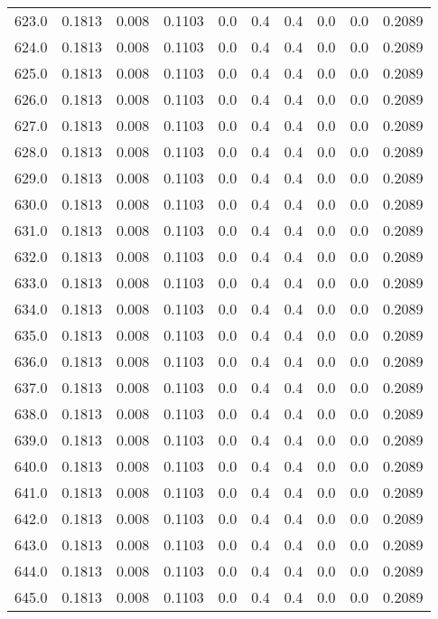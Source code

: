 \begin{longtable}{lrrrrrrrrr}
623.0 & 0.1813 & 0.008 & 0.1103 & 0.0 & 0.4 & 0.4 & 0.0 & 0.0 & 0.2089 \\
624.0 & 0.1813 & 0.008 & 0.1103 & 0.0 & 0.4 & 0.4 & 0.0 & 0.0 & 0.2089 \\
625.0 & 0.1813 & 0.008 & 0.1103 & 0.0 & 0.4 & 0.4 & 0.0 & 0.0 & 0.2089 \\
626.0 & 0.1813 & 0.008 & 0.1103 & 0.0 & 0.4 & 0.4 & 0.0 & 0.0 & 0.2089 \\
627.0 & 0.1813 & 0.008 & 0.1103 & 0.0 & 0.4 & 0.4 & 0.0 & 0.0 & 0.2089 \\
628.0 & 0.1813 & 0.008 & 0.1103 & 0.0 & 0.4 & 0.4 & 0.0 & 0.0 & 0.2089 \\
629.0 & 0.1813 & 0.008 & 0.1103 & 0.0 & 0.4 & 0.4 & 0.0 & 0.0 & 0.2089 \\
630.0 & 0.1813 & 0.008 & 0.1103 & 0.0 & 0.4 & 0.4 & 0.0 & 0.0 & 0.2089 \\
631.0 & 0.1813 & 0.008 & 0.1103 & 0.0 & 0.4 & 0.4 & 0.0 & 0.0 & 0.2089 \\
632.0 & 0.1813 & 0.008 & 0.1103 & 0.0 & 0.4 & 0.4 & 0.0 & 0.0 & 0.2089 \\
633.0 & 0.1813 & 0.008 & 0.1103 & 0.0 & 0.4 & 0.4 & 0.0 & 0.0 & 0.2089 \\
634.0 & 0.1813 & 0.008 & 0.1103 & 0.0 & 0.4 & 0.4 & 0.0 & 0.0 & 0.2089 \\
635.0 & 0.1813 & 0.008 & 0.1103 & 0.0 & 0.4 & 0.4 & 0.0 & 0.0 & 0.2089 \\
636.0 & 0.1813 & 0.008 & 0.1103 & 0.0 & 0.4 & 0.4 & 0.0 & 0.0 & 0.2089 \\
637.0 & 0.1813 & 0.008 & 0.1103 & 0.0 & 0.4 & 0.4 & 0.0 & 0.0 & 0.2089 \\
638.0 & 0.1813 & 0.008 & 0.1103 & 0.0 & 0.4 & 0.4 & 0.0 & 0.0 & 0.2089 \\
639.0 & 0.1813 & 0.008 & 0.1103 & 0.0 & 0.4 & 0.4 & 0.0 & 0.0 & 0.2089 \\
640.0 & 0.1813 & 0.008 & 0.1103 & 0.0 & 0.4 & 0.4 & 0.0 & 0.0 & 0.2089 \\
641.0 & 0.1813 & 0.008 & 0.1103 & 0.0 & 0.4 & 0.4 & 0.0 & 0.0 & 0.2089 \\
642.0 & 0.1813 & 0.008 & 0.1103 & 0.0 & 0.4 & 0.4 & 0.0 & 0.0 & 0.2089 \\
643.0 & 0.1813 & 0.008 & 0.1103 & 0.0 & 0.4 & 0.4 & 0.0 & 0.0 & 0.2089 \\
644.0 & 0.1813 & 0.008 & 0.1103 & 0.0 & 0.4 & 0.4 & 0.0 & 0.0 & 0.2089 \\
645.0 & 0.1813 & 0.008 & 0.1103 & 0.0 & 0.4 & 0.4 & 0.0 & 0.0 & 0.2089 \\

\end{longtable}
